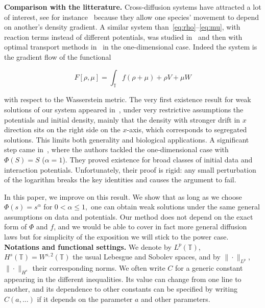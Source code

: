 \documentclass[a4paper,twosided, 11pt]{article}
\newcommand {\T}  { {\mathbb{T}} }
\theoremstyle{plain}
\theoremstyle{remark}
\numberwithin{equation}{section}
\begin{document}
\textbf{Comparison with the litterature.} Cross‐diffusion systems have attracted a lot of interest, see for instance~\cite{MR3350617,MR4497322,MR1616969,MR2083864,MR2220063,2024arXiv241205751G,MR4664467,MR4629864} because they allow one species’ movement to depend on another’s density gradient. A similar system than~\eqref{eq:rho}--\eqref{eq:mu}, with reaction terms instead of different potentials, was studied in~\cite{MR736508,MR2652018,MR4664467}  and then with optimal transport methods in~\cite{MR3870087} in the one-dimensional case. Indeed the system is the gradient flow of the functional 

$$
F[\rho,\mu] = \int_{\T}f(\rho+\mu) + \rho V + \mu W
$$

with respect to the Wasserstein metric.  The very first existence result for weak solutions of our system appeared in~\cite{MR3795211}, under very restrictive assumptions the potentials and initial density, mainly that the density
with stronger drift in $x$ direction sits on the right side on the $x$-axis, which corresponds to segregated solutions. This limits both generality and biological applications.  A significant step came in~\cite{2025arXiv250418484M}, where the authors tackled the one‑dimensional case with \(\Phi(S)=S\) (\(\alpha=1\)). They proved existence for broad classes of initial data and interaction potentials.  Unfortunately, their proof is rigid: any small perturbation of the logarithm breaks the key identities and causes the argument to fail.

In this paper, we improve on this result.  We show that as long as we choose $\Phi(s)=s^\alpha$ for $0 < \alpha\le1,$
one can obtain weak solutions under the same general assumptions on data and potentials.  Our method does not depend on the exact form of $\Phi$ and $f$, and we would be able to cover in fact more general diffusion laws but for simplicity of the exposition we will stick to the power case.\\


\textbf{Notations and functional settings.} We denote by $L^{p}(\T)$, $H^{s}(\T)=W^{s,2}(\T)$ the usual Lebesgue and Sobolev spaces, and by $\|\cdot\|_{L^{p}}$, $\|\cdot\|_{H^s}$ their corresponding norms. We often write $C$ for a generic constant appearing in the different inequalities. Its value can change from one line to another, and its dependence to other constants can be specified by writing $C(a,...)$ if it depends on the parameter $a$ and other parameters. 
\end{document}
